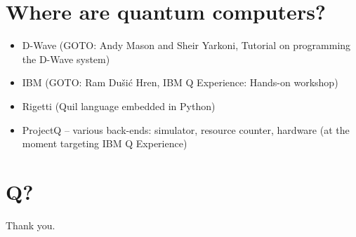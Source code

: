\documentclass{beamer}
\begin{document}
\begin{frame}{\insertsection}{\insertsubsection}
	
\end{frame}

\begin{frame}{\insertsection}{\insertsubsection}
	
\end{frame}

\section{Where are quantum computers?}

\begin{frame}{\insertsection}
	\begin{itemize}
		\item D-Wave (GOTO: Andy Mason and Sheir Yarkoni, Tutorial on 
		programming the D-Wave system) 
		\item IBM (GOTO: Ram Du\v{s}i\'c Hren, IBM Q Experience: Hands-on 
		workshop)
		\item Rigetti (Quil language embedded in Python)
		\item ProjectQ -- various back-ends: simulator, resource counter, 
		hardware (at the moment targeting IBM Q Experience)
	\end{itemize}
\end{frame}


\section{Q?}
\begin{frame}{\insertsection}
    \begin{center}
        \LARGE Thank you.
    \end{center}
\end{frame}
\end{document}
